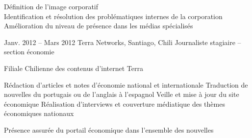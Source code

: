 \documentclass[30pt, french]{tccv}
\begin{document}
\begin{upshape}
\begin{experience}
  Définition de l’image corporatif \\
\mission{}            Identification et résolution des problématiques internes de la corporation \\
\mission{} 	      Amélioration du niveau de présence dans les médias spécialisés \\


  
\setlength{\parskip}{0pt}
\item{Janv. 2012 -- Mars 2012 }     
  {Terra Networks, Santiago, Chili}     
  {Journaliste stagiaire – section économie}
  \fontsize{9pt}{1em}\color{text}\bodyfontlight\upshape\selectfont

 Filiale Chilienne des contenus d’internet Terra  \\
  
\setlength{\parskip}{-10pt}
\begin{itemize}
      \setlength\itemsep{-3pt} 
      \cvitem[\checkmark] Rédaction d'articles et notes d’économie national et internationale
      \cvitem[\checkmark] Traduction de nouvelles du portugais ou de l'anglais à l'espagnol
      \cvitem[\checkmark] Veille et mise à jour du site économique
      \cvitem[\checkmark] Réalisation d'interviews et couverture médiatique des thèmes économiques nationaux
\end{itemize}        

 Présence assurée du portail économique dans l’ensemble des nouvelles \\
\mission{}           

   

\end{experience}






\end{upshape}
\end{document}
